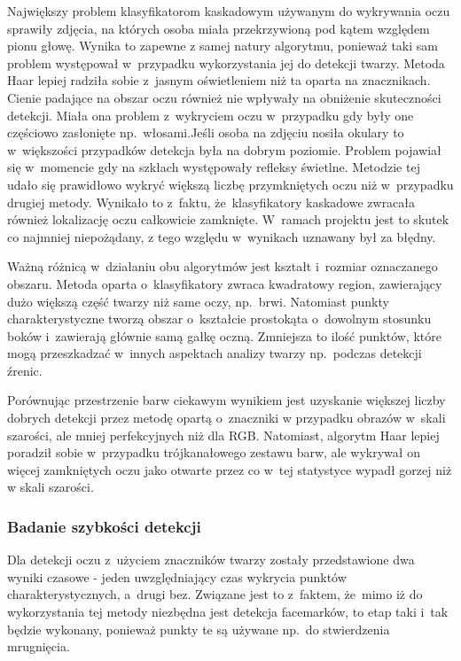 Największy problem klasyfikatorom kaskadowym używanym do wykrywania oczu sprawiły zdjęcia, na których osoba miała przekrzywioną pod kątem względem pionu głowę. Wynika to zapewne z samej natury algorytmu, ponieważ taki sam problem występował w~przypadku wykorzystania jej do detekcji twarzy. Metoda Haar lepiej radziła sobie z~jasnym oświetleniem niż ta oparta na znacznikach. Cienie padające na obszar oczu również nie wpływały na obniżenie skuteczności detekcji. Miała ona problem z~wykryciem oczu w~przypadku gdy były one częściowo zasłonięte np.~włosami.Jeśli osoba na zdjęciu nosiła okulary to w~większości przypadków detekcja była na dobrym poziomie. Problem pojawiał się w~momencie gdy na szkłach występowały refleksy świetlne. Metodzie tej udało się prawidłowo wykryć większą liczbę przymkniętych oczu niż w~przypadku drugiej metody. Wynikało to z~faktu, że~klasyfikatory kaskadowe zwracała również lokalizację oczu całkowicie zamknięte. W~ramach projektu jest to skutek co najmniej niepożądany, z tego względu w~wynikach uznawany był za błędny. 



\vspace{5mm}

Ważną różnicą w~działaniu obu algorytmów jest kształt i~rozmiar oznaczanego obszaru. Metoda oparta o~klasyfikatory zwraca kwadratowy region, zawierający dużo większą część twarzy niż same oczy, np.~brwi. Natomiast punkty charakterystyczne tworzą obszar o~kształcie prostokąta o~dowolnym stosunku boków i~zawierają głównie samą gałkę oczną. Zmniejsza to ilość punktów, które mogą przeszkadzać w~innych aspektach analizy twarzy np.~podczas detekcji źrenic.

\vspace{5mm}

Porównując przestrzenie barw ciekawym wynikiem jest uzyskanie większej liczby dobrych detekcji przez metodę opartą o~znaczniki w przypadku obrazów w~skali szarości, ale mniej perfekcyjnych niż dla RGB. Natomiast, algorytm Haar lepiej poradził sobie w~przypadku trójkanałowego zestawu barw, ale wykrywał on więcej zamkniętych oczu jako otwarte przez co w~tej statystyce wypadł gorzej niż w skali szarości. 




\subsubsection{Badanie szybkości detekcji} \label{section:eye_detection_speed_img}

Dla detekcji oczu z~użyciem znaczników twarzy zostały przedstawione dwa wyniki czasowe - jeden uwzględniający czas wykrycia punktów charakterystycznych, a~drugi bez. Związane jest to z~faktem, że~mimo iż do wykorzystania tej metody niezbędna jest detekcja facemarków, to etap taki i~tak będzie wykonany, ponieważ punkty te są używane np.~do stwierdzenia mrugnięcia. 

